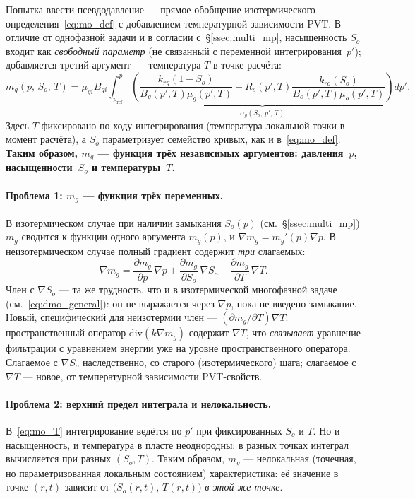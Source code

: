 ﻿\documentclass[12pt,a4paper]{article}
\begin{document}
Попытка ввести псевдодавление --- прямое обобщение
изотермического определения~\eqref{eq:mo_def} с добавлением
температурной зависимости PVT. В отличие от однофазной
задачи и в согласии с~\S\ref{ssec:multi_mp}, насыщенность
$S_o$ входит как \emph{свободный параметр} (не связанный
с переменной интегрирования~$p'$); добавляется третий
аргумент~--- температура $T$ в точке расчёта:
\begin{equation}\label{eq:mo_T}
  m_g(p,\,S_o,\,T) = \mu_{gi}B_{gi}\int_{p_{\mathrm{ref}}}^{p}
  \underbrace{\left(\frac{k_{rg}(1 - S_o)}{B_g(p',T)\mu_g(p',T)}
  + R_s(p',T)\frac{k_{ro}(S_o)}{B_o(p',T)\mu_o(p',T)}\right)}_{\displaystyle
    \alpha_g(S_o,\,p',\,T)}dp'.
\end{equation}
Здесь $T$ фиксировано по ходу интегрирования (температура
локальной точки в момент расчёта), а $S_o$ параметризует
семейство кривых, как и в~\eqref{eq:mo_def}. \textbf{Таким образом,
$m_g$ --- функция трёх независимых аргументов: давления~$p$,
насыщенности~$S_o$ и температуры~$T$.}

\paragraph{Проблема 1: $m_g$ --- функция трёх переменных.}
В изотермическом случае при наличии замыкания $S_o(p)$
(см.~\S\ref{ssec:multi_mp}) $m_g$ сводится к функции одного
аргумента $m_g(p)$, и $\nabla m_g = m_g'(p)\nabla p$.
В неизотермическом случае полный градиент содержит
\emph{три} слагаемых:
\begin{equation}\label{eq:grad_mo_T}
  \nabla m_g = \frac{\partial m_g}{\partial p}\,\nabla p
  + \frac{\partial m_g}{\partial S_o}\,\nabla S_o
  + \frac{\partial m_g}{\partial T}\,\nabla T.
\end{equation}
Член с $\nabla S_o$ --- та же трудность, что и в изотермической
многофазной задаче (см.~\eqref{eq:dmo_general}): он не выражается
через $\nabla p$, пока не введено замыкание. Новый, специфический
для неизотермии член --- $(\partial m_g/\partial T)\nabla T$:
пространственный оператор $\mathrm{div}(k\nabla m_g)$ содержит
$\nabla T$, что \emph{связывает} уравнение фильтрации с уравнением
энергии уже на уровне пространственного оператора.
Слагаемое с $\nabla S_o$ наследственно, со старого (изотермического)
шага; слагаемое с $\nabla T$ --- новое, от температурной зависимости
PVT-свойств.

\paragraph{Проблема 2: верхний предел интеграла и нелокальность.}
В~\eqref{eq:mo_T} интегрирование ведётся по $p'$ при фиксированных
$S_o$ и $T$. Но и насыщенность, и температура в пласте неоднородны:
в разных точках интеграл вычисляется при разных $(S_o, T)$.
Таким образом, $m_g$ --- нелокальная (точечная, но параметризованная
локальным состоянием) характеристика: её значение в точке $(r,t)$
зависит от $\bigl(S_o(r,t),\,T(r,t)\bigr)$ \emph{в этой же точке}.
\end{document}
